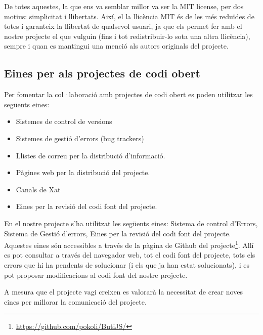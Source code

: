 De totes aquestes, la que ens va semblar millor va ser la MIT license, per dos motius: simplicitat i llibertats. Així, el la llicència MIT és de les més reduïdes de totes i garanteix la llibertat de qualsevol usuari, ja que els permet fer amb el nostre projecte el que vulguin (fins i tot redistribuir-lo sota una altra llicència), sempre i quan es mantingui una menció als autors originals del projecte. 

\subsection{Eines per als projectes de codi obert}

Per fomentar la col·laboració amb projectes de codi obert es poden utilitzar les següents eines: 

\begin{itemize}
\item{Sistemes de control de versions}
\item{Sistemes de gestió d'errors (bug trackers)}
\item{Llistes de correu per la distribució d'informació.}
\item{Pàgines web per la distribució del projecte.}
\item{Canals de Xat}
\item{Eines per la revisió del codi font del projecte.}
\end{itemize}

En el nostre projecte s'ha utilitzat les següents eines: Sistema de control d'Errors, Sistema de Gestió d'errors, Eines per la revisió del codi font del projecte. Aquestes eines són accessibles a través de la pàgina de Github del projecte\footnote{\url{https://github.com/pokoli/ButiJS/}}. Allí es pot consultar a través del navegador web, tot el codi font del projecte, tots els errors que hi ha pendents de solucionar (i els que ja han estat solucionats), i es pot proposar modificacions al codi font del nostre projecte. 

A mesura que el projecte vagi creixen es valorarà la necessitat de crear noves eines per millorar la comunicació del projecte. 


